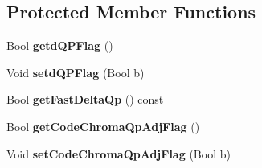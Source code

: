 \subsection*{Protected Member Functions}
\begin{DoxyCompactItemize}
\item 
\mbox{\label{class_t_enc_cu_aee648858b7d60994359389d97becbe5b}} 
Bool {\bfseries getd\+Q\+P\+Flag} ()
\item 
\mbox{\label{class_t_enc_cu_a8368774c1ce85d6ee14499d6dc5e9f6d}} 
Void {\bfseries setd\+Q\+P\+Flag} (Bool b)
\item 
\mbox{\label{class_t_enc_cu_a68e205802ce6cd289734573a0a380304}} 
Bool {\bfseries get\+Fast\+Delta\+Qp} () const
\item 
\mbox{\label{class_t_enc_cu_a03666e681b4d90f94429b0eea056f902}} 
Bool {\bfseries get\+Code\+Chroma\+Qp\+Adj\+Flag} ()
\item 
\mbox{\label{class_t_enc_cu_a600d7e65eb5f776250a547c36a22bc47}} 
Void {\bfseries set\+Code\+Chroma\+Qp\+Adj\+Flag} (Bool b)
\end{DoxyCompactItemize}
